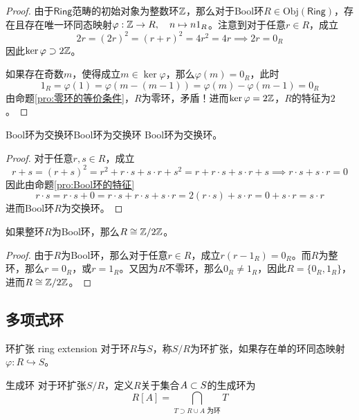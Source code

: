\begin{proof}
	由于$\mathsf{Ring}$范畴的初始对象为整数环$\mathbb{Z}$，那么对于Bool环$R\in \mathrm{Obj}(\mathsf{Ring})$，存在且存在唯一环同态映射$\varphi:\mathbb{Z}\to R,\quad n\mapsto n1_R$。注意到对于任意$r\in R$，成立
	$$
	2r=(2r)^2=(r+r)^2=4r^2=4r\implies 2r=0_R
	$$
	因此$\ker\varphi\supset 2\mathbb{Z}$。
	
	如果存在奇数$m$，使得成立$m\in\ker\varphi$，那么$\varphi(m)=0_R$，此时
	$$
	1_R=\varphi(1)=\varphi(m-(m-1))=\varphi(m)-\varphi(m-1)=0_R
	$$
	由命题\ref{pro:零环的等价条件}，$R$为零环，矛盾！进而$\ker\varphi= 2\mathbb{Z}$，$R$的特征为$2$。
\end{proof}

\begin{proposition}{Bool环为交换环}{Bool环为交换环}
	Bool环为交换环。
\end{proposition}

\begin{proof}
	对于任意$r,s\in R$，成立
	$$
	r+s=(r+s)^2
	=r^2+r\cdot s+s\cdot r+s^2
	=r+r\cdot s+s\cdot r+s
	\implies r\cdot s+s\cdot r=0
	$$
	因此由命题\ref{pro:Bool环的特征}
	$$
	r\cdot s
	=r\cdot s+0
	=r\cdot s+r\cdot s+s\cdot r
	=2(r\cdot s)+s\cdot r
	=0+s\cdot r
	=s\cdot r
	$$
	进而Bool环$R$为交换环。
\end{proof}

\begin{proposition}
	如果整环$R$为Bool环，那么$R\cong \mathbb{Z}/2\mathbb{Z}$。
\end{proposition}

\begin{proof}
	由于$R$为Bool环，那么对于任意$r\in R$，成立$r(r-1_R)=0_R$。而$R$为整环，那么$r=0_R$，或$r=1_R$。又因为$R$不零环，那么$0_R\ne 1_R$，因此$R=\{0_R,1_R\}$，进而$R\cong \mathbb{Z}/2\mathbb{Z}$。
\end{proof}

\subsection{多项式环}

\begin{definition}{环扩张 ring extension}
	对于环$R$与$S$，称$S/R$为环扩张，如果存在单的环同态映射$\varphi:R\hookrightarrow S$。
\end{definition}

\begin{definition}{生成环}
	对于环扩张$S/R$，定义$R$关于集合$A\subset S$的生成环为
	$$
	R[A]=\bigcap_{T\supset R\cup A\text{ 为环}}T
	$$
\end{definition}

